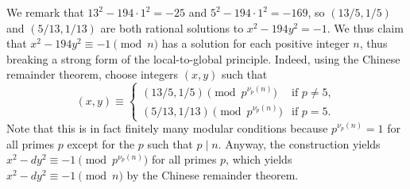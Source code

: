 \documentclass[../notes.tex]{subfiles}
\begin{document}
\begin{remark}
	We remark that $13^2-194\cdot1^2=-25$ and $5^2-194\cdot1^2=-169$, so $(13/5,1/5)$ and $(5/13,1/13)$ are both rational solutions to $x^2-194y^2=-1$. We thus claim that $x^2-194y^2\equiv-1\pmod n$ has a solution for each positive integer $n$, thus breaking a strong form of the local-to-global principle. Indeed, using the Chinese remainder theorem, choose integers $(x,y)$ such that
	\[(x,y)\equiv\begin{cases}
		(13/5,1/5) \pmod{p^{\nu_p(n)}} & \text{if }p\ne5, \\
		(5/13,1/13) \pmod{p^{\nu_p(n)}} & \text{if }p=5.
	\end{cases}\]
	Note that this is in fact finitely many modular conditions because $p^{\nu_p(n)}=1$ for all primes $p$ except for the $p$ such that $p\mid n$. Anyway, the construction yields $x^2-dy^2\equiv-1\pmod{p^{\nu_p(n)}}$ for all primes $p$, which yields $x^2-dy^2\equiv-1\pmod n$ by the Chinese remainder theorem.
\end{remark}
\end{document}
